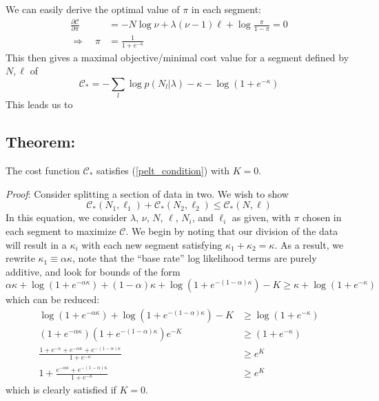 \documentclass[11pt]{article}
\begin{document}
We can easily derive the optimal value of $\pi$ in each segment:
\begin{align}
    \frac{\partial \mathcal{C}}{\partial \pi} &= -N\log \nu + \lambda (\nu - 1)\ell + \log \frac{\pi}{1-\pi} = 0 \\
    \Rightarrow \quad \pi &= \frac{1}{1 + e^{-\kappa}}
\end{align}
This then gives a maximal objective/minimal cost value for a segment defined by $N, \ell$ of
\begin{equation}
    \mathcal{C}_* = -\sum_l \log p(N_l|\lambda) -\kappa - \log (1 + e^{-\kappa})
\end{equation}
This leads us to

\subsection*{Theorem:} The cost function $\mathcal{C}_*$ satisfies (\ref{pelt_condition}) with $K = 0$.

\emph{Proof}: Consider splitting a section of data in two. We wish to show
\begin{equation}
    \mathcal{C}_*(N_1, \ell_1) + \mathcal{C}_*(N_2, \ell_2) \le \mathcal{C}_*(N, \ell)
\end{equation}
In this equation, we consider $\lambda$, $\nu$, $N$, $\ell$, $N_i$, and $\ell_i$ as given, with $\pi$ chosen in each segment to maximize $\mathcal{C}$. We begin by noting that our division of the data will result in a $\kappa_i$ with each new segment satisfying $\kappa_1 + \kappa_2 = \kappa$. As a result, we rewrite $\kappa_1 \equiv \alpha \kappa$, note that the ``base rate'' log likelihood terms are purely additive, and look for bounds of the form
\begin{equation}
    \alpha \kappa + \log(1 + e^{-\alpha \kappa}) +
    (1 - \alpha) \kappa + \log(1 + e^{-(1 - \alpha) \kappa})
    -K \ge
    \kappa + \log (1 + e^{-\kappa})
\end{equation}
which can be reduced:
\begin{align}
    \log(1 + e^{-\alpha \kappa}) +
    \log(1 + e^{-(1 - \alpha) \kappa})
    -K &\ge
    \log (1 + e^{-\kappa}) \\
    (1 + e^{-\alpha \kappa})
    (1 + e^{-(1 - \alpha) \kappa})
    e^{-K} &\ge
    (1 + e^{-\kappa}) \\
    \frac{1 + e^{-\kappa} + e^{-\alpha\kappa} + e^{-(1 - \alpha)\kappa}}{1 + e^{-\kappa}} &\ge e^K \\
    1 + \frac{e^{-\alpha\kappa} + e^{-(1 - \alpha)\kappa}}{1 + e^{-\kappa}} &\ge e^K
\end{align}
which is clearly satisfied if $K = 0$.
\end{document}

